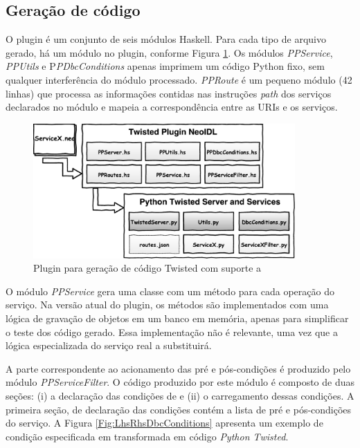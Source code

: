 \subsection{Geração de código}

O plugin \twisted{} é um conjunto de seis módulos Haskell. Para cada tipo de
arquivo gerado, há um módulo no plugin, conforme Figura \ref{PluginTwisted}. Os
módulos \emph{PPService}, \emph{PPUtils} e P\emph{PDbcConditions} apenas
imprimem um código Python fixo, sem qualquer interferência do módulo \neoidl{}
processado. \emph{PPRoute} é um pequeno módulo (42 linhas) que processa as
informações contidas nas instruções \emph{path} dos serviços declarados no
módulo \neoidl{} e mapeia a correspondência entre as URIs e os serviços.

\begin{figure}[!htb]
\centering
\includegraphics[width=100mm,trim = 0mm 0mm 0mm 
0mm,clip]{img/PluginTwisted.pdf}
\caption{Plugin para geração de código Twisted com suporte a \designbycontract{}}
\label{PluginTwisted}
\end{figure}

O módulo \emph{PPService} gera uma classe com um método para cada operação do
serviço. Na versão atual do plugin, os métodos são implementados com uma lógica
de gravação de objetos em um banco em memória, apenas para simplificar o teste
dos código gerado. Essa implementação não é relevante, uma vez que a lógica
especializada do serviço real a substituirá.

A parte correspondente ao acionamento das pré e pós-condições é produzido pelo
módulo \emph{PPServiceFilter}. O código produzido por este módulo é composto de
duas seções: (i) a declaração das condições de \designbycontract{} e (ii) o
carregamento dessas condições. A primeira seção, de declaração das condições
\designbycontract{} contém a lista de pré e pós-condições do serviço. A Figura 
\ref{Fig:LhsRhsDbcConditions} apresenta um exemplo de condição especificada em
\neoidl{} transformada em código \emph{Python Twisted}.

